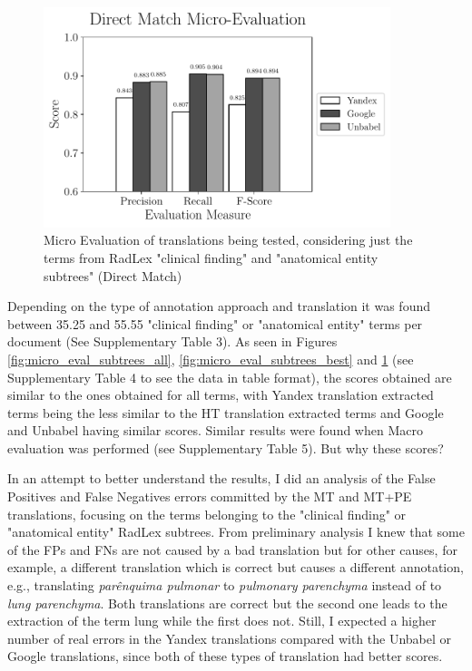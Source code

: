 \begin{figure}
	\centering
	\includegraphics[width=0.9\textwidth]{SupportFiles/plots/direct_match_micro_clinical_anatomical_subtrees_plot.pdf}
	\caption{Micro Evaluation of translations being tested, considering just the terms from RadLex "clinical finding" and "anatomical entity subtrees" (Direct Match)}
	\label{fig:micro_eval_subtrees_direct}
\end{figure}

Depending on the type of annotation approach and translation it was found between 35.25 and 55.55 "clinical finding" or "anatomical entity" terms per document (See Supplementary Table 3). As seen in Figures \ref{fig:micro_eval_subtrees_all}, \ref{fig:micro_eval_subtrees_best} and \ref{fig:micro_eval_subtrees_direct} (see Supplementary Table 4 to see the data in table format), the scores obtained are similar to the ones obtained for all terms, with Yandex translation extracted terms being the less similar to the HT translation extracted terms and Google and Unbabel having similar scores. Similar results were found when Macro evaluation was performed (see Supplementary Table 5). But why these scores? 

In an attempt to better understand the results, I did an analysis of the False Positives and False Negatives errors committed by the MT and MT+PE translations, focusing on the terms belonging to the "clinical finding" or "anatomical entity" RadLex subtrees. From preliminary analysis I knew that some of the FPs and FNs are not caused by a bad translation but for other causes, for example, a different translation which is correct but causes a different annotation, e.g., translating \textit{parênquima pulmonar} to \textit{pulmonary parenchyma} instead of to \textit{lung parenchyma}. Both translations are correct but the second one leads to the extraction of the term lung while the first does not. Still, I expected a higher number of real errors in the Yandex translations compared with the Unbabel or Google translations, since both of these types of translation had better scores.

